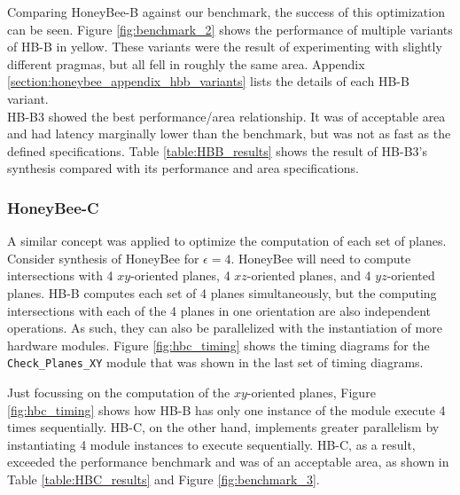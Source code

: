         Comparing HoneyBee-B against our benchmark, the success of this optimization can be seen. Figure \ref{fig:benchmark_2} shows the performance of multiple variants of \gls{HB-B} in yellow. These variants were the result of experimenting with slightly different \glspl{pragma}, but all fell in roughly the same area. Appendix \ref{section:honeybee_appendix_hbb_variants} lists the details of each \gls{HB-B} variant. \\
        HB-B3 showed the best performance/area relationship. It was of acceptable area and had latency marginally lower than the benchmark, but was not as fast as the defined specifications. Table \ref{table:HBB_results} shows the result of HB-B3's synthesis compared with its performance and area specifications.

        

        

    \subsubsection{HoneyBee-C}
        A similar concept was applied to optimize the computation of each set of planes. Consider synthesis of HoneyBee for $\epsilon = 4$. HoneyBee will need to compute intersections with 4 $xy$-oriented planes, 4 $xz$-oriented planes, and 4 $yz$-oriented planes. \gls{HB-B} computes each set of 4 planes simultaneously, but the computing intersections with each of the 4 planes in one orientation are also independent operations. As such, they can also be parallelized with the instantiation of more hardware modules. Figure \ref{fig:hbc_timing} shows the timing diagrams for the \texttt{Check\_Planes\_XY} module that was shown in the last set of timing diagrams.

        

        Just focussing on the computation of the $xy$-oriented planes, Figure \ref{fig:hbc_timing} shows how \gls{HB-B} has only one instance of the module execute 4 times sequentially. \gls{HB-C}, on the other hand, implements greater parallelism by instantiating 4 module instances to execute sequentially. \gls{HB-C}, as a result, exceeded the performance benchmark and was of an acceptable area, as shown in Table \ref{table:HBC_results} and Figure \ref{fig:benchmark_3}.

        

        